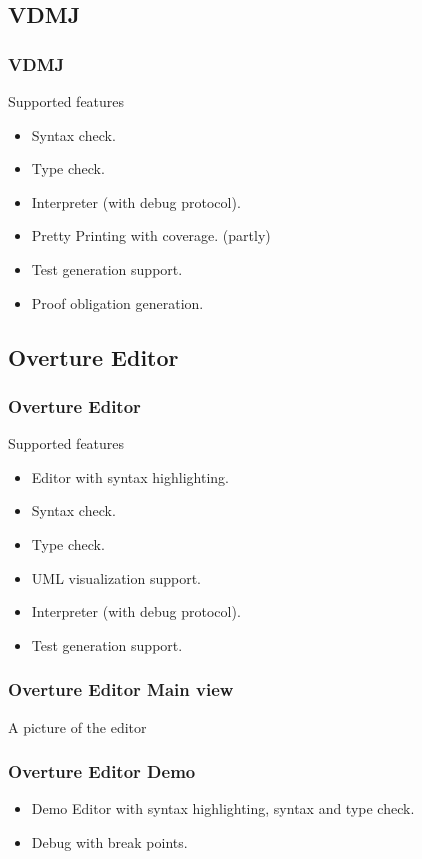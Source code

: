 \documentclass{beamer}
\begin{document}
\subsection{VDMJ}
\frame
{
  \frametitle{VDMJ}

Supported features
  \begin{itemize}
  \item<1-> Syntax check.      
  \item<1-> Type check.
  \item<1-> Interpreter (with debug protocol).
  \item<1-> Pretty Printing with coverage. (partly)
  \item<1-> Test generation support.
  \item<1-> Proof obligation generation.
  \end{itemize}
}


\subsection{Overture Editor}
\frame
{
  \frametitle{Overture Editor}

Supported features
  \begin{itemize}
  \item<1-> Editor with syntax highlighting.
  \item<1-> Syntax check.      
  \item<1-> Type check.
  \item<1-> UML visualization support.
  \item<1-> Interpreter (with debug protocol).
  \item<1-> Test generation support.
  \end{itemize}
}

\frame
{
  \frametitle{Overture Editor Main view}

 A picture of the editor
}

\frame
{
  \frametitle{Overture Editor Demo}

  \begin{itemize}
  \item<1-> Demo Editor with syntax highlighting, syntax and type check.
  \item<2-> Debug with break points.      

  \end{itemize}
}
\end{document}
